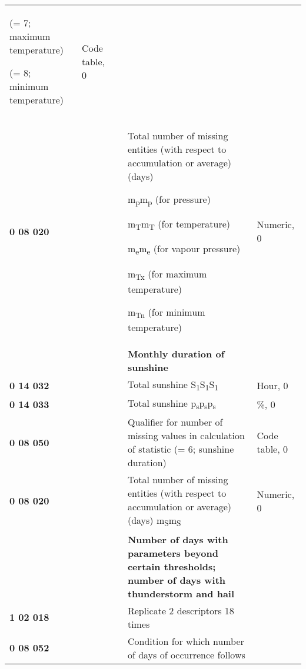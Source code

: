 \begin{longtable}[]{@{}lllll@{}}
\begin{minipage}[t]{0.17\columnwidth}
(= 7; maximum temperature)

(= 8; minimum temperature)\strut
\end{minipage} & \begin{minipage}[t]{0.17\columnwidth}\raggedright
Code table, 0\strut
\end{minipage}\tabularnewline
\begin{minipage}[t]{0.17\columnwidth}\raggedright
\textbf{0 08 020}\strut
\end{minipage} & \begin{minipage}[t]{0.17\columnwidth}\raggedright
\strut
\end{minipage} & \begin{minipage}[t]{0.17\columnwidth}\raggedright
\strut
\end{minipage} & \begin{minipage}[t]{0.17\columnwidth}\raggedright
Total number of missing entities (with respect to accumulation or average) (days)

m\textsubscript{p}m\textsubscript{p} (for pressure)

m\textsubscript{T}m\textsubscript{T} (for temperature)

m\textsubscript{e}m\textsubscript{e} (for vapour pressure)

m\textsubscript{Tx} (for maximum temperature)

m\textsubscript{Tn} (for minimum temperature)\strut
\end{minipage} & \begin{minipage}[t]{0.17\columnwidth}\raggedright
Numeric, 0\strut
\end{minipage}\tabularnewline
& & & \textbf{Monthly duration of sunshine} &\tabularnewline
\textbf{0 14 032} & & & Total sunshine S\textsubscript{1}S\textsubscript{1}S\textsubscript{1} & Hour, 0\tabularnewline
\textbf{0 14 033} & & & Total sunshine p\textsubscript{s}p\textsubscript{s}p\textsubscript{s} & \%, 0\tabularnewline
\textbf{0 08 050} & & & Qualifier for number of missing values in calculation of statistic (= 6; sunshine duration) & Code table, 0\tabularnewline
\textbf{0 08 020} & & & Total number of missing entities (with respect to accumulation or average) (days) m\textsubscript{S}m\textsubscript{S} & Numeric, 0\tabularnewline
& & & \textbf{Number of days with parameters beyond certain thresholds; number of days with thunderstorm and hail} &\tabularnewline
\textbf{1 02 018} & & & Replicate 2 descriptors 18 times &\tabularnewline
\begin{minipage}[t]{0.17\columnwidth}\raggedright
\textbf{0 08 052}\strut
\end{minipage} & \begin{minipage}[t]{0.17\columnwidth}\raggedright
\strut
\end{minipage} & \begin{minipage}[t]{0.17\columnwidth}\raggedright
\strut
\end{minipage} & \begin{minipage}[t]{0.17\columnwidth}\raggedright
Condition for which number of days of occurrence follows


\end{minipage}
\end{longtable}
